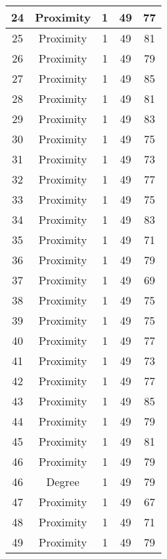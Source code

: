 \documentclass[results.tex]{subfiles}
\begin{document}
\begin{center}
\begin{tabular}{| c || c | c | c | c |}
    \hline
    24 & Proximity & 1 & 49 & 77 \\ 
    \hline
    25 & Proximity & 1 & 49 & 81 \\ 
    \hline
    26 & Proximity & 1 & 49 & 79 \\ 
    \hline
    27 & Proximity & 1 & 49 & 85 \\ 
    \hline
    28 & Proximity & 1 & 49 & 81 \\ 
    \hline
    29 & Proximity & 1 & 49 & 83 \\ 
    \hline
    30 & Proximity & 1 & 49 & 75 \\ 
    \hline
    31 & Proximity & 1 & 49 & 73 \\ 
    \hline
    32 & Proximity & 1 & 49 & 77 \\ 
    \hline
    33 & Proximity & 1 & 49 & 75 \\ 
    \hline
    34 & Proximity & 1 & 49 & 83 \\ 
    \hline
    35 & Proximity & 1 & 49 & 71 \\ 
    \hline
    36 & Proximity & 1 & 49 & 79 \\ 
    \hline
    37 & Proximity & 1 & 49 & 69 \\ 
    \hline
    38 & Proximity & 1 & 49 & 75 \\ 
    \hline
    39 & Proximity & 1 & 49 & 75 \\ 
    \hline
    40 & Proximity & 1 & 49 & 77 \\ 
    \hline
    41 & Proximity & 1 & 49 & 73 \\ 
    \hline
    42 & Proximity & 1 & 49 & 77 \\ 
    \hline
    43 & Proximity & 1 & 49 & 85 \\ 
    \hline
    44 & Proximity & 1 & 49 & 79 \\ 
    \hline
    45 & Proximity & 1 & 49 & 81 \\ 
    \hline
    46 & Proximity & 1 & 49 & 79 \\ 
    \hline
    46 & Degree & 1 & 49 & 79 \\ 
    \hline
    47 & Proximity & 1 & 49 & 67 \\ 
    \hline
    48 & Proximity & 1 & 49 & 71 \\ 
    \hline
    49 & Proximity & 1 & 49 & 79 \\ 
    \hline   \end{tabular}
\end{center}
\end{document}
